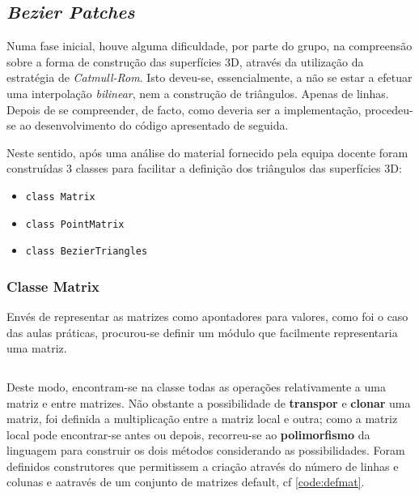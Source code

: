 \documentclass[relatorio.tex]{subfiles}
\begin{document}
    
\subsection{\textit{Bezier Patches}} \label{subsec:bezier_p}

Numa fase inicial, houve alguma dificuldade, por parte do grupo,
na compreensão sobre a forma de construção das superfícies 3D, através da utilização
da estratégia de \textit{Catmull-Rom}.
Isto deveu-se, essencialmente, a não se estar a efetuar uma interpolação \textit{bilinear},
nem a construção de triângulos. Apenas de linhas.
Depois de se compreender, de facto, como  deveria ser a implementação,
procedeu-se ao desenvolvimento do código apresentado de seguida.

Neste sentido, após uma análise do material fornecido pela equipa docente foram construídas 3 classes para facilitar a definição dos triângulos das superfícies 3D:
\begin{itemize}
    \item \texttt{class Matrix}
    \item \texttt{class PointMatrix}
    \item \texttt{class BezierTriangles}
\end{itemize}

\subsubsection{Classe Matrix}
Envés de representar as matrizes como apontadores para valores, como foi o caso das aulas práticas,
procurou-se definir um módulo que facilmente representaria uma matriz. 
\begin{code}
    \label{code:class_matrix}
    \inputminted[firstline=14, lastline=19]{cpp}{../../cartesian/matrix.h}
\end{code}

Deste modo, encontram-se na classe todas as operações relativamente a uma matriz e entre matrizes.
Não obstante a possibilidade de \textbf{transpor} e \textbf{clonar} uma matriz,
foi definida a multiplicação entre a matriz local e outra;
como a matriz local pode encontrar-se antes ou depois,
recorreu-se ao \textbf{polimorfismo} da linguagem para construir os dois métodos 
considerando as possibilidades.
Foram definidos construtores que permitissem a criação através do número de linhas e colunas
e aatravés de um conjunto de matrizes default, cf \ref{code:defmat}.
\end{document}

